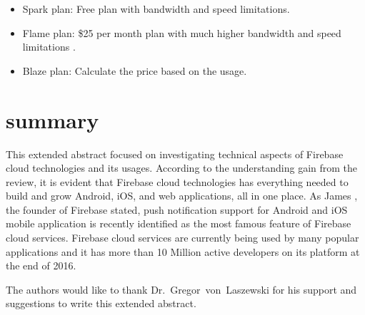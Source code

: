 \begin{itemize} \item Spark plan: Free plan with bandwidth and speed
	limitations. \item Flame plan: \$25 per month plan with much higher 
	bandwidth
	and speed limitations . \item Blaze plan: Calculate the price based on the
	usage. \end{itemize}

\section{summary} This extended abstract focused on investigating technical aspects of
Firebase cloud technologies and its usages. According to the understanding gain
from the review, it is evident that Firebase cloud technologies has everything
needed to build and grow Android, iOS, and web applications, all in one place.
As James \cite{hid-sp18-409-www-firebase}, the founder of Firebase stated, push
notification support for Android and iOS mobile application is recently
identified as the most famous feature of Firebase cloud services. Firebase cloud
services are currently being used by many popular applications and it has more
than 10 Million active developers on its platform  at the end of
2016\cite{hid-sp18-409-www-firebase}.

\begin{acks}
	
	The authors would like to thank Dr.~Gregor~von~Laszewski for his support and
	suggestions to write this extended abstract.
	
\end{acks}


 

